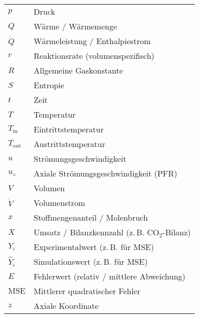 \begin{small}
\begin{flushleft}
\begin{longtable}{@{}ll@{}}
$p$                 & Druck \\
$Q$                 & Wärme / Wärmemenge \\
$\dot Q$            & Wärmeleistung / Enthalpiestrom \\
$r$                 & Reaktionsrate (volumenspezifisch) \\
$R$                 & Allgemeine Gaskonstante \\
$S$                 & Entropie \\
$t$                 & Zeit \\
$T$                 & Temperatur \\
$T_{\mathrm{in}}$   & Eintrittstemperatur \\
$T_{\mathrm{out}}$  & Austrittstemperatur \\
$u$                 & Strömungsgeschwindigkeit \\
$u_z$               & Axiale Strömungsgeschwindigkeit (PFR) \\
$V$                 & Volumen \\
$\dot V$            & Volumenstrom \\
$x$                 & Stoffmengenanteil / Molenbruch \\
$X$                 & Umsatz / Bilanzkennzahl (z.\,B. CO$_2$-Bilanz) \\
$Y_i$               & Experimentalwert (z.\,B. für MSE) \\
$\hat Y_i$          & Simulationswert (z.\,B. für MSE) \\
$E$                 & Fehlerwert (relativ / mittlere Abweichung) \\
$\mathrm{MSE}$      & Mittlerer quadratischer Fehler \\
$z$                 & Axiale Koordinate \\
\end{longtable}
\end{flushleft}
\end{small}

